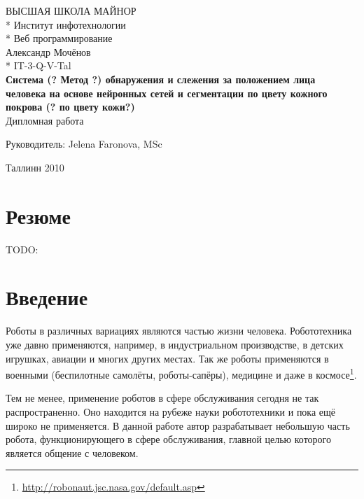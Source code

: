 \documentclass[12pt]{report}
\begin{document}

\begin{titlepage}
  \begin{center}
	\uppercase{Высшая школа майнор}\\*
	Институт инфотехнологии\\*
	Веб программирование\\[8cm]
	Александр Мочёнов\\*
	IT-3-Q-V-Tal\\[0.5cm]
	\large
	\textbf{Система (? Метод ?) обнаружения и слежения за положением лица человека на основе нейронных сетей и сегментации по цвету кожного покрова (? по цвету кожи?)}\\[1cm]
	\normalsize
	Дипломная работа\\[2cm]
	\begin{flushright}
		Руководитель: Jelena Faronova, MSc\\[6cm]
	\end{flushright}
	Таллинн 2010
  \end{center}
\end{titlepage}

\tableofcontents{\thispagestyle{fancyplain}}

\chapter*{Резюме}
\thispagestyle{fancy}

TODO:


\chapter*{Введение}
\thispagestyle{fancy}

Роботы в различных вариациях являются частью жизни человека. Робототехника уже
давно применяются, например, в индустриальном производстве, в детских игрушках,
авиации и многих других местах. Так же роботы применяются в военными (беспилотные
самолёты, роботы-сапёры), медицине и даже в космосе\footnote{\url{http://robonaut.jsc.nasa.gov/default.asp}}.

Тем не менее, применение роботов в сфере обслуживания сегодня не так распространенно. Оно находится на рубеже науки робототехники и пока ещё широко не применяется. В данной работе автор разрабатывает небольшую
часть робота, функционирующего в сфере обслуживания, главной целью которого
является общение с человеком. 
\end{document}
